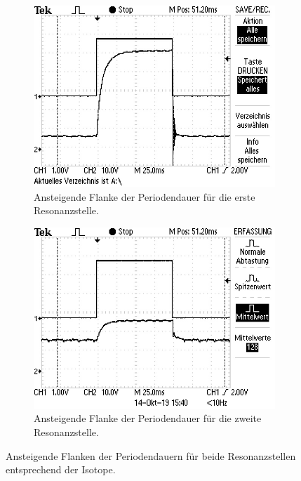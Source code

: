 \begin{figure}
  \centering
  \begin{subfigure}{0.46\textwidth}
    \centering
    \includegraphics[angle=90, width=\textwidth]{bilder/flanke1.jpg}
    \caption{Ansteigende Flanke der Periodendauer für die erste Resonanzstelle.}
    \label{sub-abb:87}
  \end{subfigure}
  \qquad
  \begin{subfigure}{0.46\textwidth}
    \centering
    \includegraphics[angle=90, width=\textwidth]{bilder/flanke2.jpg}
    \caption{Ansteigende Flanke der Periodendauer für die zweite Resonanzstelle.}
    \label{sub-abb:85}
  \end{subfigure}
  \caption{Ansteigende Flanken der Periodendauern für beide Resonanzstellen entsprechend der Isotope.}
  \label{fig:signal1}
\end{figure}
